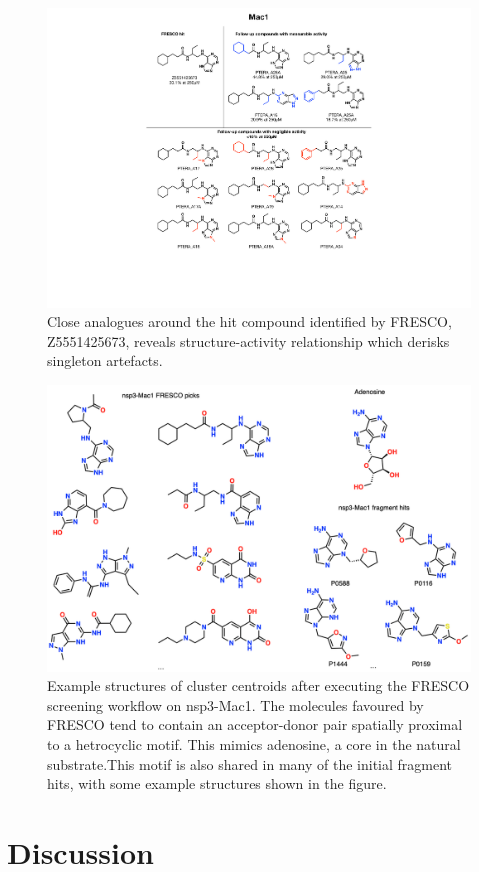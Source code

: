 \begin{figure}
    \centering
    \includegraphics[width=0.75\linewidth]{Chapters/Fresco/Figs/mac1_rounds.pdf}
    \caption{Close analogues around the hit compound identified by FRESCO, Z5551425673, reveals structure-activity relationship which derisks singleton artefacts.}
    \label{fig:mac1_rounds}
\end{figure}

\begin{figure}
    \centering
    \includegraphics[width=0.75\linewidth]{Chapters/Fresco/Figs/mac1_ligands.png}
    \caption{Example structures of cluster centroids after executing the FRESCO screening workflow on nsp3-Mac1. The molecules favoured by FRESCO tend to contain an acceptor-donor pair spatially proximal to a hetrocyclic motif. This mimics adenosine, a core in the natural substrate.This motif is also shared in many of the initial fragment hits, with some example structures shown in the figure.}
    \label{fig:mac1_ligands}
\end{figure}
\section{Discussion} \label{sec:discussion}

